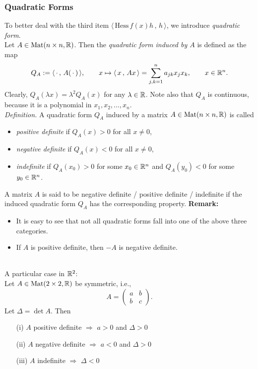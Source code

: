 \documentclass[11pt, t]{beamer}
\renewcommand{\emph}[1]{{\color{Turquoise3}\textsl{#1}}}
\newcommand{\myseries}[2]{$#1_1,#1_2,\dots,#1_#2$}
\newcommand{\nullspace}{~\\[15pt]}
\newcommand{\scp}[2]{\langle\,#1\,,\,#2\,\rangle} \newcommand{\scpp}{\langle\,\cdot\,,\,\cdot\,\rangle}
\begin{document}
\begin{frame}[allowframebreaks]
    \frametitle{Quadratic Forms}
    To better deal with the third item $\scp{\text{Hess}\,f(x)h}{h}$, we introduce \emph{quadratic form}.\nullspace
    Let $A\in\text{Mat}(n\times n,\mathbb{R})$. Then the \emph{quadratic form induced by $A$} is defined as the map
    \[Q_A:=\scp{\cdot}{A(\,\cdot\,)},\qquad
        x\mapsto\scp{x}{Ax}=\sum_{j,k=1}^{n}a_{jk}x_jx_k,
        \qquad x\in\R^n.\]
    Clearly, $Q_A(\lambda x)=\lambda^2Q_A(x)$ for any $\lambda\in\mathbb{R}$. Note also that $Q_A$ is continuous, because it is a polynomial in \myseries{x}{n}.\\[8pt]
    \emph{Definition.} A quadratic form $Q_A$ induced by a matrix $A\in\text{Mat}(n\times n,\mathbb{R})$ is called
    \begin{itemize}
        \item \emph{positive definite} if $Q_A(x)>0$ for all $x\neq0$,
        \item \emph{negative definite} if $Q_A(x)<0$ for all $x\neq0$,
        \item \emph{indefinite} if $Q_A(x_0)>0$ for some $x_0\in\mathbb{R}^n$ and $Q_A(y_0)<0$ for some $y_0\in\mathbb{R}^n$.
    \end{itemize}
    A matrix $A$ is said to be negative definite / positive definite / indefinite if the induced quadratic form $Q_A$ has the corresponding property.
    \newpage
    \textbf{Remark:}
    \begin{itemize}
        \item It is easy to see that not all quadratic forms fall into one of the above
              three categories.
        \item If $A$ is positive definite, then $-A$ is negative definite.
    \end{itemize}
    \nullspace
    A particular case in $\mathbb{R}^2$:\\[8pt]
    Let $A\in\text{Mat}(2\times 2,\mathbb{R})$ be symmetric, i.e.,
    \[A=\begin{pmatrix}
            a & b \\
            b & c
        \end{pmatrix}.\]
    Let $\Delta=\det A$. Then
    \begin{itemize}
        \item[(i)] $A$ positive definite $\Rightarrow$ $a>0$ and $\Delta>0$
        \item[(ii)] $A$ negative definite $\Rightarrow$ $a<0$ and $\Delta>0$
        \item[(iii)] $A$ indefinite $\Rightarrow$ $\Delta<0$
    \end{itemize}
\end{frame}
\end{document}
